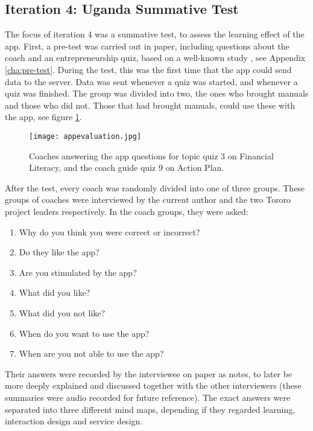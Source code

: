 \subsection{Iteration 4: Uganda Summative Test}

The focus of iteration 4 was a summative test, to assess the learning effect of the app. First, a pre-test was carried out in paper, including questions about the coach and an entrepreneurship quiz, based on a well-known study \citep{general-entrepreneurship-quiz}, see Appendix \ref{cha:pre-test}. During the test, this was the first time that the app could send data to the server. Data was sent whenever a quiz was started, and whenever a quiz was finished. The group was divided into two, the ones who brought manuals and those who did not. Those that had brought manuals, could use these with the app, see figure \ref{fig:appevaluation}.

\begin{figure}[h]
    \centering
    \texttt{[image: appevaluation.jpg]}
    \caption{Coaches answering the app questions for topic quiz 3 on Financial Literacy, and the coach guide quiz 9 on Action Plan.}
    \label{fig:appevaluation}
\end{figure}

After the test, every coach was randomly divided into one of three groups. These groups of coaches were interviewed by the current author and the two Tororo project leaders respectively. In the coach groups, they were asked:

\begin{enumerate}
\item Why do you think you were correct or incorrect?
\item Do they like the app?
\item Are you stimulated by the app?
\item What did you like?
\item What did you not like?
\item When do you want to use the app?
\item When are you not able to use the app?
\end{enumerate}

Their answers were recorded by the interviewee on paper as notes, to later be more deeply explained and discussed together with the other interviewers (these summaries were audio recorded for future reference). The exact answers were separated into three different mind maps, depending if they regarded learning, interaction design and service design.


